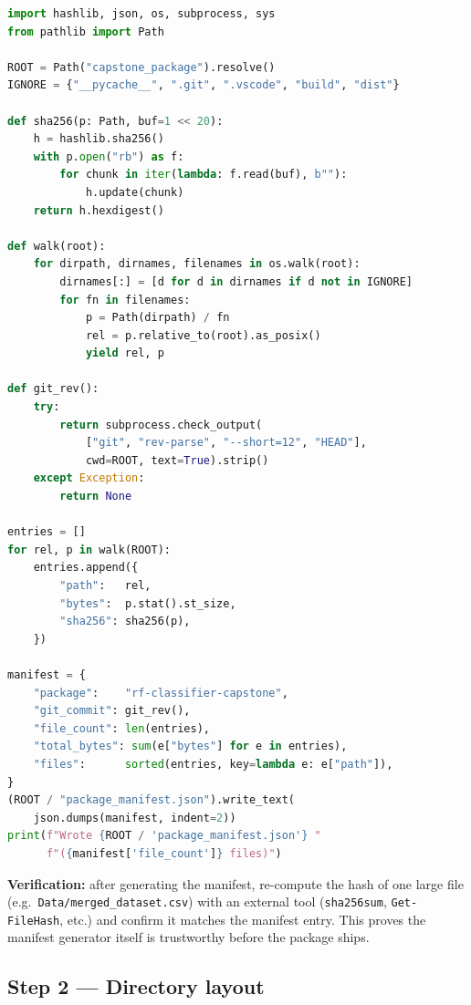 \documentclass[11pt,letterpaper]{article}
\begin{document}
\begin{lstlisting}[language=Python, caption={Reference manifest generator (\texttt{make\_manifest.py}).}]
import hashlib, json, os, subprocess, sys
from pathlib import Path

ROOT = Path("capstone_package").resolve()
IGNORE = {"__pycache__", ".git", ".vscode", "build", "dist"}

def sha256(p: Path, buf=1 << 20):
    h = hashlib.sha256()
    with p.open("rb") as f:
        for chunk in iter(lambda: f.read(buf), b""):
            h.update(chunk)
    return h.hexdigest()

def walk(root):
    for dirpath, dirnames, filenames in os.walk(root):
        dirnames[:] = [d for d in dirnames if d not in IGNORE]
        for fn in filenames:
            p = Path(dirpath) / fn
            rel = p.relative_to(root).as_posix()
            yield rel, p

def git_rev():
    try:
        return subprocess.check_output(
            ["git", "rev-parse", "--short=12", "HEAD"],
            cwd=ROOT, text=True).strip()
    except Exception:
        return None

entries = []
for rel, p in walk(ROOT):
    entries.append({
        "path":   rel,
        "bytes":  p.stat().st_size,
        "sha256": sha256(p),
    })

manifest = {
    "package":    "rf-classifier-capstone",
    "git_commit": git_rev(),
    "file_count": len(entries),
    "total_bytes": sum(e["bytes"] for e in entries),
    "files":      sorted(entries, key=lambda e: e["path"]),
}
(ROOT / "package_manifest.json").write_text(
    json.dumps(manifest, indent=2))
print(f"Wrote {ROOT / 'package_manifest.json'} "
      f"({manifest['file_count']} files)")
\end{lstlisting}

\textbf{Verification:} after generating the manifest, re-compute the hash of one large file (e.g.\ \texttt{Data/merged\_dataset.csv}) with an external tool (\texttt{sha256sum}, \texttt{Get-FileHash}, etc.) and confirm it matches the manifest entry. This proves the manifest generator itself is trustworthy before the package ships.

\subsection{Step 2 --- Directory layout}
\end{document}
